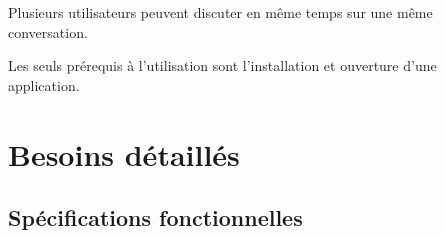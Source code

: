 \documentclass[11pt,dvipsnames,svgnames]{report}
\begin{document}
\begin{mdframed}[topline=false,rightline=false,bottomline=false, linewidth=3pt,linecolor=red]
Plusieurs utilisateurs peuvent discuter en même temps sur une même conversation.
\end{mdframed}

Les seuls prérequis à l'utilisation sont l'installation et ouverture d'une application.

\section{Besoins détaillés}

\subsection{Spécifications fonctionnelles}
\end{document}
